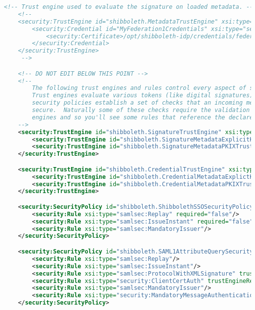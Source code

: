 \begin{lstlisting}[language=xml]
    <!-- Trust engine used to evaluate the signature on loaded metadata. -->
    <!--
    <security:TrustEngine id="shibboleth.MetadataTrustEngine" xsi:type="security:StaticExplicitKeySignature">
        <security:Credential id="MyFederation1Credentials" xsi:type="security:X509Filesystem">
            <security:Certificate>/opt/shibboleth-idp/credentials/federation1.crt</security:Certificate>
        </security:Credential>
    </security:TrustEngine>
     -->

    <!-- DO NOT EDIT BELOW THIS POINT -->
    <!--
        The following trust engines and rules control every aspect of security related to incoming messages.
        Trust engines evaluate various tokens (like digital signatures) for trust worthiness while the
        security policies establish a set of checks that an incoming message must pass in order to be considered
        secure.  Naturally some of these checks require the validation of the tokens evaluated by the trust
        engines and so you'll see some rules that reference the declared trust engines.
    -->
    <security:TrustEngine id="shibboleth.SignatureTrustEngine" xsi:type="security:SignatureChaining">
        <security:TrustEngine id="shibboleth.SignatureMetadataExplicitKeyTrustEngine" xsi:type="security:MetadataExplicitKeySignature" metadataProviderRef="ShibbolethMetadata"/>
        <security:TrustEngine id="shibboleth.SignatureMetadataPKIXTrustEngine" xsi:type="security:MetadataPKIXSignature" metadataProviderRef="ShibbolethMetadata"/>
    </security:TrustEngine>

    <security:TrustEngine id="shibboleth.CredentialTrustEngine" xsi:type="security:Chaining">
        <security:TrustEngine id="shibboleth.CredentialMetadataExplictKeyTrustEngine" xsi:type="security:MetadataExplicitKey" metadataProviderRef="ShibbolethMetadata"/>
        <security:TrustEngine id="shibboleth.CredentialMetadataPKIXTrustEngine" xsi:type="security:MetadataPKIXX509Credential" metadataProviderRef="ShibbolethMetadata"/>
    </security:TrustEngine>

    <security:SecurityPolicy id="shibboleth.ShibbolethSSOSecurityPolicy" xsi:type="security:SecurityPolicyType">
        <security:Rule xsi:type="samlsec:Replay" required="false"/>
        <security:Rule xsi:type="samlsec:IssueInstant" required="false"/>
        <security:Rule xsi:type="samlsec:MandatoryIssuer"/>
    </security:SecurityPolicy>

    <security:SecurityPolicy id="shibboleth.SAML1AttributeQuerySecurityPolicy" xsi:type="security:SecurityPolicyType">
        <security:Rule xsi:type="samlsec:Replay"/>
        <security:Rule xsi:type="samlsec:IssueInstant"/>
        <security:Rule xsi:type="samlsec:ProtocolWithXMLSignature" trustEngineRef="shibboleth.SignatureTrustEngine"/>
        <security:Rule xsi:type="security:ClientCertAuth" trustEngineRef="shibboleth.CredentialTrustEngine"/>
        <security:Rule xsi:type="samlsec:MandatoryIssuer"/>
        <security:Rule xsi:type="security:MandatoryMessageAuthentication"/>
    </security:SecurityPolicy>


\end{lstlisting}
